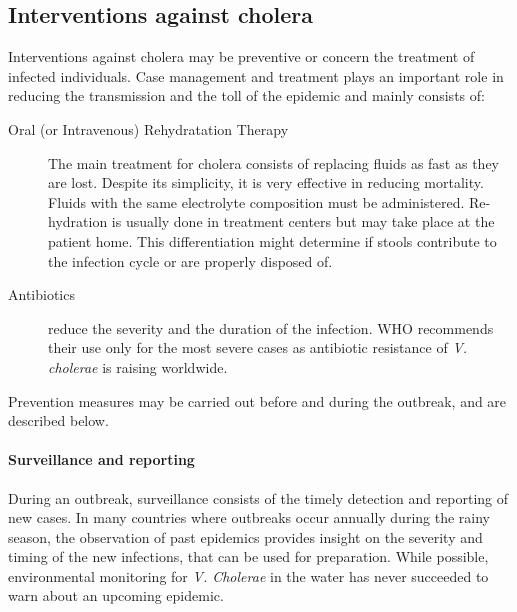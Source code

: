 \subsection{Interventions against cholera} 
Interventions against cholera may be preventive or concern the treatment of infected individuals. Case management and treatment plays an important role in reducing the transmission and the toll of the epidemic and mainly consists of:
\begin{description}
\item[Oral (or Intravenous) Rehydratation Therapy] The main treatment for cholera consists of replacing fluids as fast as they are lost. Despite its simplicity, it is very effective in reducing mortality. Fluids with the same electrolyte composition must be administered\cite{Kuhn:GlucoseNotRiceBased:2014}.  Re-hydration is usually done in treatment centers but may take place at the patient home. This differentiation might determine if stools contribute to the infection cycle or are properly disposed of.
\item[Antibiotics] reduce the severity and the duration of the infection. WHO recommends their use only for the most severe cases as antibiotic resistance of \emph{V. cholerae} is raising worldwide\cite{Sack:GettingSeriousCholera:2006}.
\end{description}

Prevention measures may be carried out before and during the outbreak, and are described below.

\paragraph{Surveillance and reporting} During an outbreak, surveillance consists of the timely detection and reporting of new cases. In many countries where outbreaks occur annually during the rainy season, the observation of past epidemics provides insight on the severity and timing of the new infections, that can be used for preparation\cite{Baracchini:SeasonalityCholeraDynamics:2017}. While possible, environmental monitoring for \textit{V. Cholerae} in the water has never succeeded to warn about an upcoming epidemic. 

